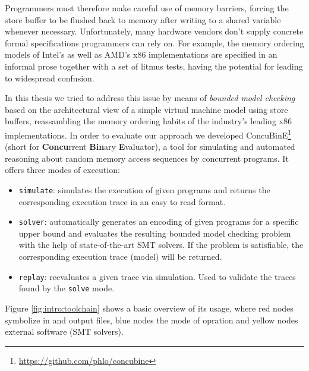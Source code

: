 Programmers must therefore make careful use of memory barriers,
forcing the store buffer to be flushed back to memory after writing to a shared variable whenever necessary.
Unfortunately, many hardware vendors don't supply concrete formal specifications programmers can rely on.
For example, the memory ordering models of Intel's \cite{ref:Intel} as well as AMD's \cite{ref:AMD} x86 implementations are specified in an informal prose together with a set of litmus tests, having the potential for leading to widespread confusion.


\newpage

In this thesis we tried to address this issue by
means of \emph{bounded model checking} \cite{ref:BMC}
based on the architectural view of a simple virtual machine model using store buffers,
reassambling the memory ordering habits of
the industry's leading
x86 implementations.
In order to evaluate our approach we developed
ConcuBinE\footnote{\url{https://github.com/phlo/concubine}} (short for \textbf{Concu}rrent \textbf{Bin}ary \textbf{E}valuator),
a tool for simulating and
automated reasoning about
random memory access sequences by
concurrent programs.
It offers three modes of execution:
\begin{itemize}
  \item \texttt{simulate}:
    simulates the execution of given programs and returns the corresponding execution trace in an easy to read format.
  \item \texttt{solver}:
    automatically generates an encoding of given programs for a specific upper bound and evaluates the resulting bounded model checking problem with the help of state-of-the-art SMT solvers.
    If the problem is satisfiable, the corresponding execution trace (model) will be returned.
  \item \texttt{replay}:
    reevaluates a given trace via simulation.
    Used to validate the traces found by the \texttt{solve} mode.
\end{itemize}
Figure \ref{fig:intro:toolchain} shows a basic overview of its usage,
where red nodes symbolize in and output files,
blue nodes the mode of opration
and yellow nodes external software (SMT solvers).

